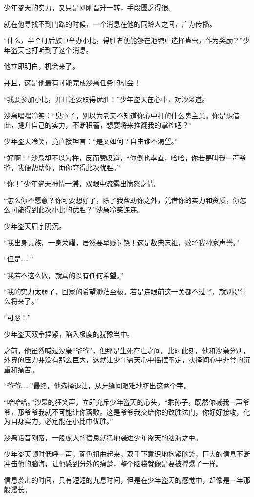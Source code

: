 \begin{this_body}
少年盗天的实力，又只是刚刚晋升一转，手段匮乏得很。

就在他寻找不到门路的时候，一个消息在他的同龄人之间，广为传播。

“什么，半个月后族中举办小比，得胜者便能够在池塘中选择蛊虫，作为奖励？”少年盗天也打听到了这个消息。

他立即明白，机会来了。

并且，这是他最有可能完成沙枭任务的机会！

“我要参加小比，并且还要取得优胜！”少年盗天在心中，对沙枭道。

沙枭嘿嘿冷笑：“臭小子，别以为老夫不知道你心中打的什么鬼主意。你是想借此，提升自己的实力，不断积蓄，想要将来推翻我的掌控吧？”

少年盗天冷笑，竟直接坦言：“是又如何？自由谁不渴望。”

“好啊！”沙枭却不以为杵，反而赞叹道，“你倒也率直，哈哈，你若是叫我一声爷爷，我便帮助你，助你夺得此次优胜。”

“你！”少年盗天神情一滞，双眼中流露出愤怒之情。

“怎么你不愿意？你可要想好了，除了我帮助你之外，凭借你的实力和资质，你怎么可能得到此次小比的优胜？”沙枭冷笑连连。

少年盗天眉宇阴沉。

“我出身贵族，一身荣耀，居然要卑贱讨饶！这是数典忘祖，败坏我孙家声誉。”

“但是……”

“我若不这么做，就真的没有任何希望。”

“我的实力太弱了，回家的希望渺茫至极。若是连眼前这一关都不过了，就别提什么将来了。”

“可恶！”

少年盗天双拳捏紧，陷入极度的犹豫当中。

之前，他虽然喊过沙枭“爷爷”，但那是生死存亡之间。此时此刻，他和沙枭分别，外界的压力并没有那么巨大，这就让少年盗天心中摇摆不定，抉择间心中非常的沉重和痛苦。

“爷爷……”最终，他选择退让，从牙缝间艰难地挤出这两个字。

“哈哈哈。”沙枭的狂笑声，立即充斥少年盗天的心头，“乖孙子，既然你喊我一声爷爷，那爷爷我就不可能让你落败。这是爷爷我交给你的致胜法门，你好好接收，化为自身实力，必定能在小比中优胜。”

沙枭话音刚落，一股庞大的信息就猛地袭进少年盗天的脑海之中。

少年盗天顿时低呼一声，面色扭曲起来，双手下意识地抱紧脑袋，巨大的信息不断冲击他的脑海，让他感到分外的痛楚，整个脑袋就像是要被撑爆了一样。

信息袭击的时间，只有短短的九息时间，但是在少年盗天的感觉中，却像是一年那般漫长。


\end{this_body}
